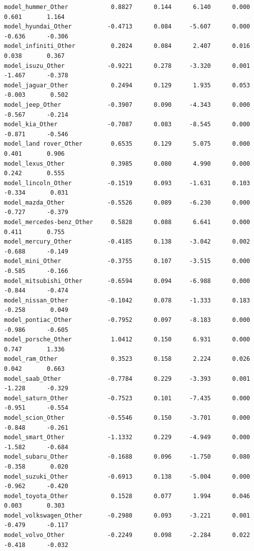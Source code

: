 \documentclass[
  12pt]{article}
\begin{document}
\begin{verbatim}
model_hummer_Other            0.8827      0.144      6.140      0.000       0.601       1.164
model_hyundai_Other          -0.4713      0.084     -5.607      0.000      -0.636      -0.306
model_infiniti_Other          0.2024      0.084      2.407      0.016       0.038       0.367
model_isuzu_Other            -0.9221      0.278     -3.320      0.001      -1.467      -0.378
model_jaguar_Other            0.2494      0.129      1.935      0.053      -0.003       0.502
model_jeep_Other             -0.3907      0.090     -4.343      0.000      -0.567      -0.214
model_kia_Other              -0.7087      0.083     -8.545      0.000      -0.871      -0.546
model_land rover_Other        0.6535      0.129      5.075      0.000       0.401       0.906
model_lexus_Other             0.3985      0.080      4.990      0.000       0.242       0.555
model_lincoln_Other          -0.1519      0.093     -1.631      0.103      -0.334       0.031
model_mazda_Other            -0.5526      0.089     -6.230      0.000      -0.727      -0.379
model_mercedes-benz_Other     0.5828      0.088      6.641      0.000       0.411       0.755
model_mercury_Other          -0.4185      0.138     -3.042      0.002      -0.688      -0.149
model_mini_Other             -0.3755      0.107     -3.515      0.000      -0.585      -0.166
model_mitsubishi_Other       -0.6594      0.094     -6.988      0.000      -0.844      -0.474
model_nissan_Other           -0.1042      0.078     -1.333      0.183      -0.258       0.049
model_pontiac_Other          -0.7952      0.097     -8.183      0.000      -0.986      -0.605
model_porsche_Other           1.0412      0.150      6.931      0.000       0.747       1.336
model_ram_Other               0.3523      0.158      2.224      0.026       0.042       0.663
model_saab_Other             -0.7784      0.229     -3.393      0.001      -1.228      -0.329
model_saturn_Other           -0.7523      0.101     -7.435      0.000      -0.951      -0.554
model_scion_Other            -0.5546      0.150     -3.701      0.000      -0.848      -0.261
model_smart_Other            -1.1332      0.229     -4.949      0.000      -1.582      -0.684
model_subaru_Other           -0.1688      0.096     -1.750      0.080      -0.358       0.020
model_suzuki_Other           -0.6913      0.138     -5.004      0.000      -0.962      -0.420
model_toyota_Other            0.1528      0.077      1.994      0.046       0.003       0.303
model_volkswagen_Other       -0.2980      0.093     -3.221      0.001      -0.479      -0.117
model_volvo_Other            -0.2249      0.098     -2.284      0.022      -0.418      -0.032

\end{verbatim}
\end{document}
